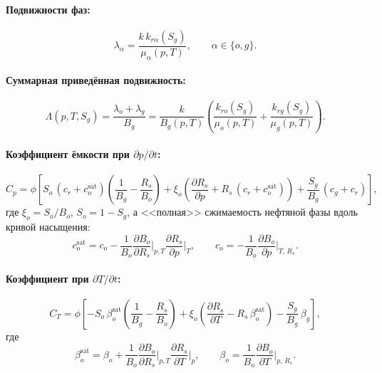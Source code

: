 \documentclass[12pt,a4paper]{article}
\newcommand{\pp}{\partial}
\newcommand{\sat}{\mathrm{sat}}
\begin{document}
\paragraph{Подвижности фаз:}
\begin{equation}\label{eq:mobility}
  \lambda_\alpha = \frac{k\,k_{r\alpha}(S_g)}{\mu_\alpha(p,T)},
  \qquad \alpha \in \{o, g\}.
\end{equation}

\paragraph{Суммарная приведённая подвижность:}
\begin{equation}\label{eq:Lambda}
  \Lambda(p,T,S_g) = \frac{\lambda_o + \lambda_g}{B_g}
  = \frac{k}{B_g(p,T)}\!\left(
      \frac{k_{ro}(S_g)}{\mu_o(p,T)}
      + \frac{k_{rg}(S_g)}{\mu_g(p,T)}
    \right).
\end{equation}

\paragraph{Коэффициент ёмкости при $\pp p/\pp t$:}
\begin{equation}\label{eq:Cp}
  C_p = \phi\!\left[
    S_o\,(c_r + c_o^\sat)\!\left(\frac{1}{B_g} - \frac{R_s}{B_o}\right)
    + \xi_o\!\left(\frac{\pp R_s}{\pp p}
      + R_s\,(c_r + c_o^\sat)\right)
    + \frac{S_g}{B_g}\,(c_g + c_r)
  \right],
\end{equation}
где $\xi_o = S_o/B_o$, $S_o = 1 - S_g$, а <<полная>> сжимаемость
нефтяной фазы вдоль кривой насыщения:
\begin{equation}\label{eq:co_sat}
  c_o^\sat = c_o
    - \frac{1}{B_o}\frac{\pp B_o}{\pp R_s}\bigg|_{p,T}
      \frac{\pp R_s}{\pp p}\bigg|_T,
  \qquad
  c_o = -\frac{1}{B_o}\frac{\pp B_o}{\pp p}\bigg|_{T,\,R_s}.
\end{equation}

\paragraph{Коэффициент при $\pp T/\pp t$:}
\begin{equation}\label{eq:CT}
  C_T = \phi\!\left[
    -S_o\,\beta_o^\sat\!\left(\frac{1}{B_g} - \frac{R_s}{B_o}\right)
    + \xi_o\!\left(\frac{\pp R_s}{\pp T}
      - R_s\,\beta_o^\sat\right)
    - \frac{S_g}{B_g}\,\beta_g
  \right],
\end{equation}
где
\begin{equation}\label{eq:beta_o_sat}
  \beta_o^\sat = \beta_o
    + \frac{1}{B_o}\frac{\pp B_o}{\pp R_s}\bigg|_{p,T}
      \frac{\pp R_s}{\pp T}\bigg|_p,
  \qquad
  \beta_o = \frac{1}{B_o}\frac{\pp B_o}{\pp T}\bigg|_{p,\,R_s}.
\end{equation}
\end{document}
